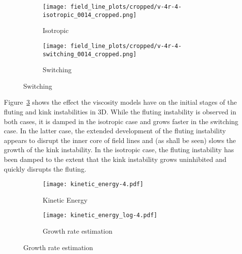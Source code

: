 \begin{figure}[t]
  \centering
    \begin{subfigure}{0.49\textwidth}
      \texttt{[image: field\_line\_plots/cropped/v-4r-4-isotropic\_0014\_cropped.png]}
      \caption{Isotropic}
      \label{fig:field_line_plots_iso}
    \end{subfigure}
    \hfill
    \begin{subfigure}{0.49\textwidth}
      \texttt{[image: field\_line\_plots/cropped/v-4r-4-switching\_0014\_cropped.png]}
      \caption{Switching}
      \label{fig:field_line_plots_swi}
    \end{subfigure}
\label{fig:kink_field_line_plots}%
\end{figure}

Figure~\ref{fig:kink_field_line_plots} shows the effect the viscosity models have on the initial stages of the fluting and kink instabilities in 3D. While the fluting instability is observed in both cases, it is damped in the isotropic case and grows faster in the switching case. In the latter case, the extended development of the fluting instability appears to disrupt the inner core of field lines and (as shall be seen) slows the growth of the kink instability. In the isotropic case, the fluting instability has been damped to the extent that the kink instability grows uninhibited and quickly disrupts the fluting.

\begin{figure}[t]
  \centering
    \begin{subfigure}{0.49\textwidth}
      \texttt{[image: kinetic\_energy-4.pdf]}
      \caption{Kinetic Energy}
      \label{fig:kink_ke-4}
    \end{subfigure}
    \hfill
    \begin{subfigure}{0.49\textwidth}
      \texttt{[image: kinetic\_energy\_log-4.pdf]}
      \caption{Growth rate estimation}
      \label{fig:kink_ke_log-4}
    \end{subfigure}
\label{fig:kink_str8_ke-4}%
\end{figure}

